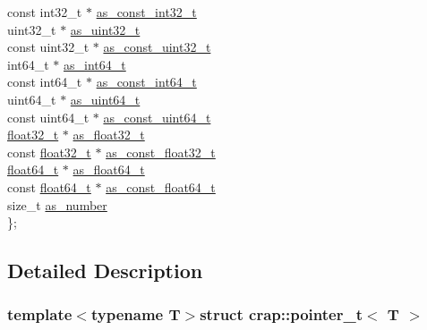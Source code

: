 \begin{DoxyCompactItemize}
\begin{tabbing}
\>const int32\_t $\ast$ \hyperlink{structcrap_1_1pointer__t_a9d42c28d7e4642583907174295bef068}{as\_const\_int32\_t}\\
\>uint32\_t $\ast$ \hyperlink{structcrap_1_1pointer__t_adf2f1a4f92a44f4899bab5d1743e0b0b}{as\_uint32\_t}\\
\>const uint32\_t $\ast$ \hyperlink{structcrap_1_1pointer__t_a93e98760d5f987b6eefc1b96a5b7d00d}{as\_const\_uint32\_t}\\
\>int64\_t $\ast$ \hyperlink{structcrap_1_1pointer__t_a6755b7dbb833df711003a1b6e3188916}{as\_int64\_t}\\
\>const int64\_t $\ast$ \hyperlink{structcrap_1_1pointer__t_aa450d0a7bc03e4a67cce1e2f4bb034eb}{as\_const\_int64\_t}\\
\>uint64\_t $\ast$ \hyperlink{structcrap_1_1pointer__t_a7e0460a4477f27ab4fc4279e8ed360ce}{as\_uint64\_t}\\
\>const uint64\_t $\ast$ \hyperlink{structcrap_1_1pointer__t_a72c063a43850807a483d3d91f08b6ebd}{as\_const\_uint64\_t}\\
\>\hyperlink{crap__types_8h_a4611b605e45ab401f02cab15c5e38715}{float32\_t} $\ast$ \hyperlink{structcrap_1_1pointer__t_abf47bccc7d7e58456107e9e32000aa7f}{as\_float32\_t}\\
\>const \hyperlink{crap__types_8h_a4611b605e45ab401f02cab15c5e38715}{float32\_t} $\ast$ \hyperlink{structcrap_1_1pointer__t_afa325f26f6fb096a38c8215d5cfecdb4}{as\_const\_float32\_t}\\
\>\hyperlink{crap__types_8h_ac55f3ae81b5bc9053760baacf57e47f4}{float64\_t} $\ast$ \hyperlink{structcrap_1_1pointer__t_ae0aa92260ed533bcb965a1d3cc45349a}{as\_float64\_t}\\
\>const \hyperlink{crap__types_8h_ac55f3ae81b5bc9053760baacf57e47f4}{float64\_t} $\ast$ \hyperlink{structcrap_1_1pointer__t_a84605cb36a9a9fa5204122ca06ee126a}{as\_const\_float64\_t}\\
\>size\_t \hyperlink{structcrap_1_1pointer__t_ae1469dc75976e619e2b330e7be44a2fa}{as\_number}\\
\}; \\

\end{tabbing}\end{DoxyCompactItemize}


\subsection{Detailed Description}
\subsubsection*{template$<$typename T$>$struct crap\+::pointer\+\_\+t$<$ T $>$}



